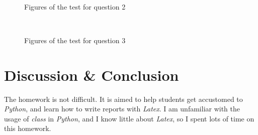 \documentclass[aps,letterpaper,10pt]{revtex4}
\begin{document}
	\begin{figure}[H]
		\centering
		 \\
		\caption{Figures of the test for question 2}
		\label{fig:oscil}
	\end{figure}

	\begin{figure}[H]
		\centering
		 \\
		\caption{Figures of the test for question 3}
		\label{fig:oscil}
	\end{figure}

\newpage


\section{Discussion \& Conclusion}
The homework is not difficult. It is aimed to help students get accustomed to \emph{Python}, and learn how to write reports with \emph{Latex}. I am unfamiliar with the usage of \emph{class} in \emph{Python}, 
and I know little about \emph{Latex}, so I spent lots of time on this homework.
\end{document}
